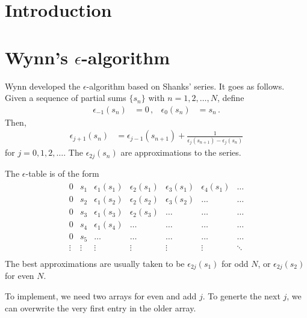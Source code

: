 \documentclass{article}
\begin{document}
\section{Introduction}
\cite{Cohen+:doi:10.1080/10586458.2000.10504632}

\section{Wynn's $\epsilon$-algorithm}
Wynn \cite{Wynn:10.2307/2002183} developed the $\epsilon$-algorithm based on
Shanks' series. It goes as follows. Given a sequence of partial sums
$\{s_n\}$ with $n=1,2,\ldots,N$, define
\begin{align}
  \epsilon_{-1}(s_n) &= 0\,, &
  \epsilon_{0}(s_n) &= s_n\,.
\end{align}
Then,
\begin{align}
  \epsilon_{j+1}(s_n)
  &=
  \epsilon_{j-1}(s_{n+1})
  + \frac{1}{\epsilon_j(s_{n+1}) - \epsilon_j(s_n)}
\end{align}
for $j=0,1,2,\ldots$. The $\epsilon_{2j}(s_n)$ are approximations to the
series.

The $\epsilon$-table is of the form
\begin{align}
  \begin{matrix}
    0 & s_1 & \epsilon_1(s_1) & \epsilon_2(s_1) & \epsilon_3(s_1) & \epsilon_4(s_1) & \ldots \\
    0 & s_2 & \epsilon_1(s_2) & \epsilon_2(s_2) & \epsilon_3(s_2) & \ldots & \ldots \\
    0 & s_3 & \epsilon_1(s_3) & \epsilon_2(s_3) & \ldots & \ldots & \ldots \\
    0 & s_4 & \epsilon_1(s_4) & \ldots & \ldots & \ldots & \ldots \\
    0 & s_5 & \ldots & \ldots & \ldots & \ldots & \ldots \\
    \vdots & \vdots & \vdots & \vdots & \vdots & \vdots & \ddots \\
  \end{matrix}
\end{align}
The best approximations are usually taken to be $\epsilon_{2j}(s_1)$ for odd
$N$, or $\epsilon_{2j}(s_2)$ for even $N$.

To implement, we need two arrays for even and add $j$. To generte the next
$j$, we can overwrite the very first entry in the older array.




\end{document}
